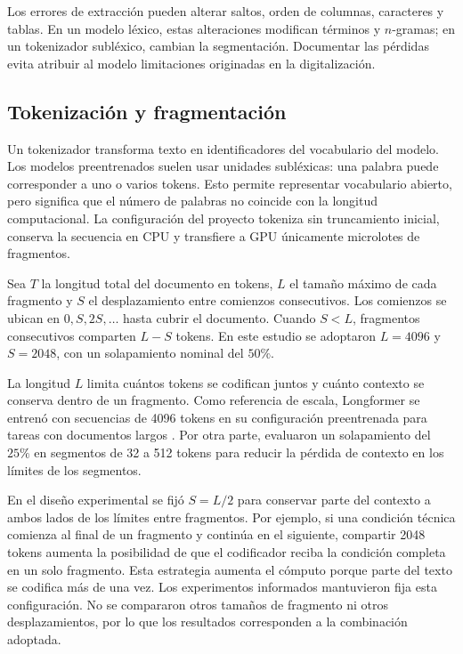 Los errores de extracción pueden alterar saltos, orden de columnas, caracteres y tablas. En un modelo léxico, estas alteraciones modifican términos y $n$-gramas; en un tokenizador subléxico, cambian la segmentación. Documentar las pérdidas evita atribuir al modelo limitaciones originadas en la digitalización.

\subsection{Tokenización y fragmentación}
\label{sec:tokenizacion_fragmentacion}

Un tokenizador transforma texto en identificadores del vocabulario del modelo. Los modelos preentrenados suelen usar unidades subléxicas: una palabra puede corresponder a uno o varios tokens. Esto permite representar vocabulario abierto, pero significa que el número de palabras no coincide con la longitud computacional. La configuración del proyecto tokeniza sin truncamiento inicial, conserva la secuencia en CPU y transfiere a GPU únicamente microlotes de fragmentos.

Sea $T$ la longitud total del documento en tokens, $L$ el tamaño máximo de cada fragmento y $S$ el desplazamiento entre comienzos consecutivos. Los comienzos se ubican en $0,S,2S,\ldots$ hasta cubrir el documento. Cuando $S<L$, fragmentos consecutivos comparten $L-S$ tokens. En este estudio se adoptaron $L=4096$ y $S=2048$, con un solapamiento nominal del $50\%$.

La longitud $L$ limita cuántos tokens se codifican juntos y cuánto contexto se conserva dentro de un fragmento. Como referencia de escala, Longformer se entrenó con secuencias de 4096 tokens en su configuración preentrenada para tareas con documentos largos \parencite{beltagy2020longformer}. Por otra parte, \textcite{dai2022revisiting} evaluaron un solapamiento del $25\%$ en segmentos de 32 a 512 tokens para reducir la pérdida de contexto en los límites de los segmentos.

En el diseño experimental se fijó $S=L/2$ para conservar parte del contexto a ambos lados de los límites entre fragmentos. Por ejemplo, si una condición técnica comienza al final de un fragmento y continúa en el siguiente, compartir 2048 tokens aumenta la posibilidad de que el codificador reciba la condición completa en un solo fragmento. Esta estrategia aumenta el cómputo porque parte del texto se codifica más de una vez. Los experimentos informados mantuvieron fija esta configuración. No se compararon otros tamaños de fragmento ni otros desplazamientos, por lo que los resultados corresponden a la combinación adoptada.

